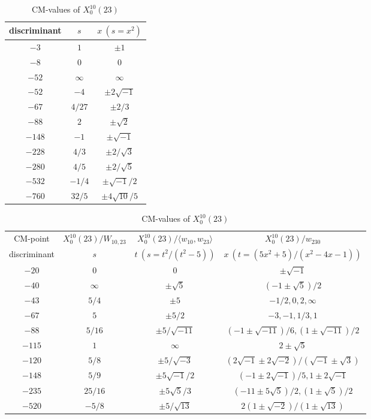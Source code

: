 \documentclass{amsart}
\theoremstyle{definition}
\begin{document}
\begin{appendices}
\begin{table}
\begin{tabular}{|c|c|c|}
discriminant & $s$ & $x\ (s=x^2)$ \\ \hline
${-3}$ & $1$ & $\pm 1$ \\ 
${-8}$ & $0$ & $0 $ \\ 
${-52}$ & $\infty$ & $\infty$ \\ 
${-52}$ & $-4$ & $\pm 2\sqrt{-1}$ \\ 
${-67}$ & ${4}/{27}$ & $\pm {2}/{3}$ \\ 
${-88}$ & $2$ & $\pm \sqrt{2}$ \\
${-148}$ & $-1$ & $\pm \sqrt{-1}$ \\ 
${-228}$ & ${4}/{3}$ & $\pm {2/\sqrt{3}}$ \\ 
${-280}$ & ${4}/{5}$ & $\pm {2/\sqrt{5}}$ \\ 
${-532}$ & $-{1}/{4}$ & $\pm {\sqrt{-1}}/{2}$ \\ 
${-760}$ & ${32}/{5}$ & $\pm {4\sqrt{10}}/{5}$ \\ \hline
\end{tabular}
\bigskip
\caption{CM-values of $X^{10}_0(19)$}



\renewcommand{\arraystretch}{1.5}
\tabcolsep=10pt                         
\begin{tabular}{|c|c|c|c|}
\hline
CM-point& $X_{0}^{10}\left( 23\right) /W_{10,23}$ &$X_{0}^{10}\left( 23\right)
/\langle w_{10},w_{23}\rangle$  &$X_{0}^{10}\left( 23\right)
/w_{230}$  \\ 
discriminant & $s$ & $t\ (s={t^2}/(t^2-5))$ & $x\ (t=(5x^2+5)/(x^2-4x-1))$ \\ \hline
${-20}$ & $0$ & $0$ & $\pm \sqrt{-1}$ \\ 
${-40}$ & $\infty $ & $\pm \sqrt{5}$ & $(-1\pm \sqrt{5})/{2}$ \\ 
${-43}$ & ${5}/{4}$ & $\pm 5$ & $-{1}/{2},0,2,\infty$ \\ 
${-67}$ & $5$ & $\pm{ 5}/{2}$ & $-3,-1,{1}/{3},1$ \\ 
${-88}$ & ${5}/{16}$ & $\pm{ 5/\sqrt{-11}}$ & $(-1\pm 
\sqrt{-11})/{6},(1\pm \sqrt{-11})/{2}$ \\ 
${-115}$ & $1$ & $\infty $ & $2\pm \sqrt{5}$ \\ 
${-120}$ & ${5}/{8}$ & $\pm{ 5/\sqrt{-3}}$ & $(2\sqrt{-1}%
\pm 2\sqrt{-2})/({\sqrt{-1}\pm \sqrt{3}})$ \\ 
${-148}$ & ${5}/{9}$ & $\pm{ 5\sqrt{-1}}/{2}$ & $(-1\pm 2\sqrt{-1})/{5},1\pm 2\sqrt{-1}
$ \\ 
${-235}$ & ${25}/{16}$ & $\pm{ 5\sqrt{5}}/{3}$ & $(-11\pm 5%
\sqrt{5})/{2},(1\pm \sqrt{5})/{2}$ \\ 
${-520}$ & $-{5}/{8}$ & $\pm {5/\sqrt{13}}$ & ${2(1\pm\sqrt{-2})}/({1\pm\sqrt{13}})$ \\ \hline
\end{tabular}
\bigskip
\caption{CM-values of $X^{10}_0(23)$}
\end{table}


\end{appendices}
\end{document}
